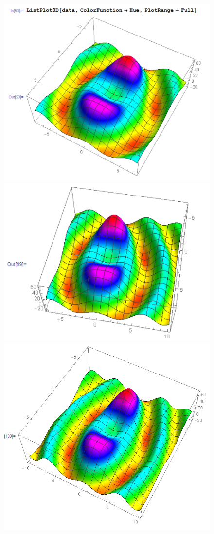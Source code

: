 \documentclass{article}
\theoremstyle{definition}
\begin{document}
\begin{figure}[!htb]
	\centering
	\includegraphics[scale=0.15]{conv-6}
	\includegraphics[scale=0.2]{conv-7}
	\includegraphics[scale=0.3]{conv-8}
\end{figure}
\end{document}
